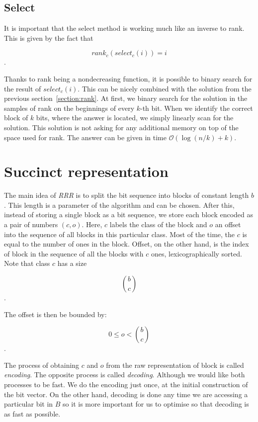 \subsection{Select}
\label{section:select}

It is important that the select method is working much like an inverse to rank. This is given
by the fact that

                $$rank_c(select_c(i)) = i$$.

Thanks to rank being a nondecreasing function, it is possible to binary search for the result
of $select_c(i)$. This can be nicely combined with the solution from the previous
section~\ref{section:rank}. At first, we binary search for the solution in the samples of rank
on the beginnings of every $k$-th bit. When we identify the correct block of $k$ bits, where
the answer is located, we simply linearly scan for the solution. This solution is not asking
for any additional memory on top of the space used for rank. The answer can be given in time
$\mathcal{O}(\log(n/k)+k)$.

\section{Succinct representation}

The main idea of \textit{RRR} is to split the bit sequence into blocks of constant length $b$.
This length is a parameter of the algorithm and can be chosen. After this, instead
of storing a single block as a bit sequence, we store each block encoded as a pair
of numbers $(c, o)$. Here, $c$ labels the class of the block and $o$ an offset into
the sequence of all blocks in this particular class. Most of the time, the $c$ is equal
to the number of ones in the block. Offset, on the other hand, is the index of block in
the sequence of all the blocks with $c$ ones, lexicographically sorted. Note that
class $c$ has a size

                $${b\choose c}$$.

The offset is then be bounded by:

				$$0 \leq o < {b\choose c}$$.

The process of obtaining $c$ and $o$ from the raw representation of block is called
\textit{encoding}. The opposite process is called \textit{decoding}. Although we would
like both processes to be fast. We do the encoding just once, at the initial construction
of the bit vector. On the other hand, decoding is done any time we are accessing a particular
bit in $B$ so it is more important for us to optimise so that decoding is as fast as possible.

